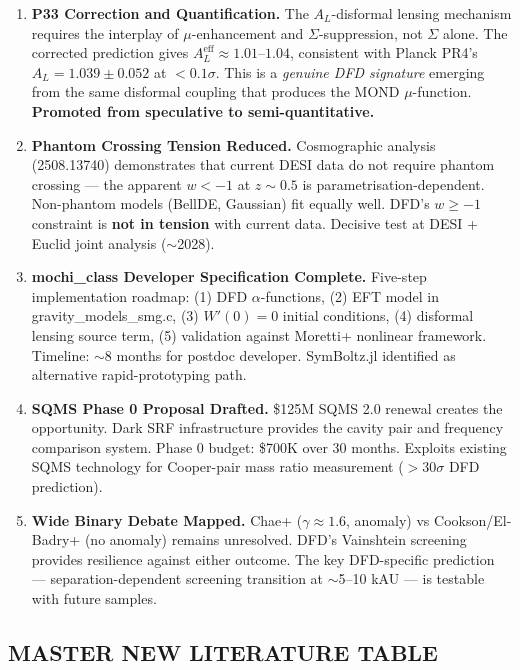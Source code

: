 \documentclass[11pt,a4paper]{article}
\begin{document}
\begin{enumerate}

\item \textbf{P33 Correction and Quantification.} The $A_L$-disformal lensing mechanism requires the interplay of $\mu$-enhancement and $\Sigma$-suppression, not $\Sigma$ alone. The corrected prediction gives $A_L^\mathrm{eff} \approx 1.01$--$1.04$, consistent with Planck PR4's $A_L = 1.039 \pm 0.052$ at $<0.1\sigma$. This is a \emph{genuine DFD signature} emerging from the same disformal coupling that produces the MOND $\mu$-function. \textbf{Promoted from speculative to semi-quantitative.}

\item \textbf{Phantom Crossing Tension Reduced.} Cosmographic analysis (2508.13740) demonstrates that current DESI data do not require phantom crossing --- the apparent $w < -1$ at $z \sim 0.5$ is parametrisation-dependent. Non-phantom models (BellDE, Gaussian) fit equally well. DFD's $w \geq -1$ constraint is \textbf{not in tension} with current data. Decisive test at DESI + Euclid joint analysis ($\sim$2028).

\item \textbf{mochi\_class Developer Specification Complete.} Five-step implementation roadmap: (1) DFD $\alpha$-functions, (2) EFT model in gravity\_models\_smg.c, (3) $W'(0) = 0$ initial conditions, (4) disformal lensing source term, (5) validation against Moretti+ nonlinear framework. Timeline: $\sim$8 months for postdoc developer. SymBoltz.jl identified as alternative rapid-prototyping path.

\item \textbf{SQMS Phase 0 Proposal Drafted.} \$125M SQMS 2.0 renewal creates the opportunity. Dark SRF infrastructure provides the cavity pair and frequency comparison system. Phase 0 budget: \$700K over 30 months. Exploits existing SQMS technology for Cooper-pair mass ratio measurement ($>30\sigma$ DFD prediction).

\item \textbf{Wide Binary Debate Mapped.} Chae+ ($\gamma \approx 1.6$, anomaly) vs Cookson/El-Badry+ (no anomaly) remains unresolved. DFD's Vainshtein screening provides resilience against either outcome. The key DFD-specific prediction --- separation-dependent screening transition at $\sim$5--10 kAU --- is testable with future samples.

\end{enumerate}

\subsection{MASTER NEW LITERATURE TABLE}
\end{document}
